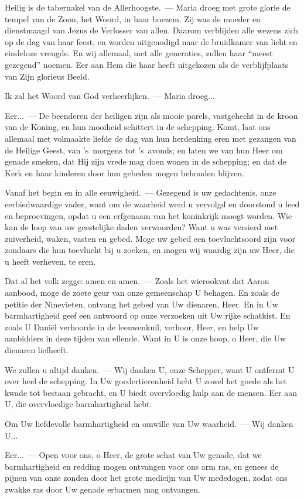 \documentclass[12pt,twoside,a5paper]{article}
\begin{document}
\begin{halfparskip}
  Heilig is de tabernakel van de Allerhoogste.~--- Maria droeg met grote glorie de tempel van de Zoon, het Woord, in haar boezem. Zij was de moeder en dienstmaagd van Jezus de Verlosser van allen. Daarom verblijden alle wezens zich op de dag van haar feest, en worden uitgenodigd naar de bruidkamer van licht en eindeloze vreugde. En wij allemaal, met alle generaties, zullen haar ``meest gezegend'' noemen. Eer aan Hem die haar heeft uitgekozen als de verblijfplaats van Zijn glorieus Beeld.

  Ik zal het Woord van God verheerlijken.~--- Maria droeg...

  Eer...~--- De beenderen der heiligen zijn als mooie parels, vastgehecht in de kroon van de Koning, en hun mooiheid schittert in de schepping. Komt, laat ons allemaal met volmaakte liefde de dag van hun herdenking eren met gezangen van de Heilige Geest, van 's~morgens tot 's~avonds; en laten we van hun Heer om genade smeken, dat Hij zijn vrede mag doen wonen in de schepping; en dat de Kerk en haar kinderen door hun gebeden
  mogen behouden blijven.

  Vanaf het begin en in alle eeuwigheid.~--- Gezegend is uw gedachtenis, onze eerbiedwaardige vader, want om de waarheid werd u vervolgd en doorstond u leed en beproevingen, opdat u een erfgenaam van het koninkrijk moogt worden. Wie kan de loop van uw geestelijke daden verwoorden? Want u was versierd met zuiverheid, waken, vasten en gebed. Moge uw gebed een toevluchtsoord zijn voor zondaars die hun toevlucht bij u zoeken, en mogen wij waardig zijn uw Heer, die u heeft verheven, te eren.

  Dat al het volk zegge: amen en amen.~--- Zoals het wierookvat dat Aaron aanbood, moge de zoete geur van onze gemeenschap U behagen. En zoals de petitie der Ninevieten, ontvang het gebed van Uw dienaren, Heer. En in Uw barmhartigheid geef een antwoord op onze verzoeken uit Uw rijke schatkist. En zoals U Daniël verhoorde in de leeuwenkuil, verhoor, Heer, en help Uw aanbidders in deze tijden van ellende. Want in U is onze hoop, o Heer, die Uw dienaren liefheeft.
\end{halfparskip}


\begin{halfparskip}
  We zullen u altijd danken.~--- Wij danken U, onze Schepper, want U ontfermt U over heel de schepping. In Uw goedertierenheid hebt U zowel het goede als het kwade tot bestaan gebracht, en U biedt overvloedig hulp aan de mensen. Eer aan U, die overvloedige barmhartigheid hebt.

  Om Uw liefdevolle barmhartigheid en omwille van Uw waarheid.~--- Wij danken U...

  Eer...~--- Open voor ons, o Heer, de grote schat van Uw genade, dat we barmhartigheid en redding mogen ontvangen voor ons arm ras, en genees de pijnen van onze zonden door het grote medicijn van Uw mededogen, zodat ons zwakke ras door Uw genade erbarmen mag ontvangen.
\end{halfparskip}
\end{document}
